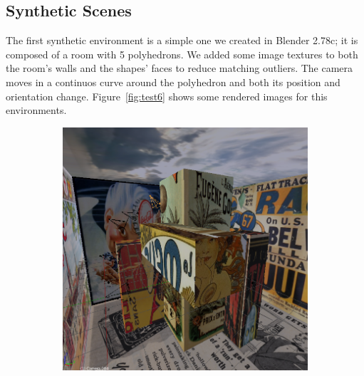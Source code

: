 \subsection{Synthetic Scenes}
The first synthetic environment is a simple one we created in Blender 2.78c;
it is composed of a room with 5 polyhedrons. We added some image textures to both
the room's walls and the shapes' faces to reduce matching outliers.
The camera moves in a continuos curve around the polyhedron and both its
position and orientation change.
Figure~\ref{fig:test6} shows some rendered images for this environments.
%
\begin{figure}
\centering
	\begin{subfigure}{0.4\textwidth}
		\centering
		\includegraphics[width=\textwidth]{img/test6_1}
	\end{subfigure}
	\begin{subfigure}{0.4\textwidth}
		\centering

\end{subfigure}
\end{figure}
